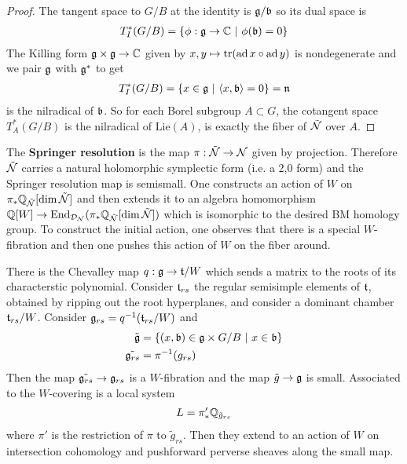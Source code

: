 \begin{proof}
    The tangent space to $G/B$ at the identity is $\mathfrak{g}/\mathfrak{b}$ so its dual space is \begin{align*}
        T^*_I(G/B) = \{\phi:\mathfrak{g} \to \mathbb{C} \ \vert \  \phi(\mathfrak{b}) = 0\}
    \end{align*} The Killing form $\mathfrak{g} \times \mathfrak{g} \to \mathbb{C}$ given by
    $x,y\mapsto \operatorname{tr}(\operatorname{ad} x \circ \operatorname{ad} y)$ is nondegenerate and we pair $\mathfrak{g}$ with $\mathfrak{g}^*$ 
    to get \begin{align*}
        T^*_I(G/B) = \{x\in \mathfrak{g} \ \vert \  \langle x,\mathfrak{b}\rangle = 0\} = \mathfrak{n}
    \end{align*} is the nilradical of $\mathfrak{b}$. So for each Borel subgroup $A\subset G$, 
    the cotangent space $T^*_{A}(G/B)$ is the nilradical of $\text{Lie}(A)$, is exactly 
    the fiber of $\tilde {{\mathcal{N}}}$ over $A$.
\end{proof}

The \textbf{Springer resolution} is the map $\pi:\tilde {{\mathcal{N}}} \to {\mathcal{N}}$
 given by projection.
Therefore $\tilde {{\mathcal{N}}}$ carries a natural holomorphic symplectic form (i.e. a 2,0 form)
and the Springer resolution map is semismall. One constructs an action of $W$ on 
$\pi_*\mathbb{Q}_{\tilde {{\mathcal{N}}}}[\dim \tilde {{\mathcal{N}}}]$ and then extends it to an algebra homomorphism 
$\mathbb{Q}[W] \to \operatorname{End}_{{\mathcal{D}}_{{\mathcal{N}}}}(\pi_*\mathbb{Q}_{\tilde {{\mathcal{N}}}}[\dim \tilde {{\mathcal{N}}}])$
which is isomorphic to the desired BM homology group. To construct the initial action,
one observes that there is a special $W$-fibration and then one pushes this action 
of $W$ on the fiber around. 

\hfill

There is the Chevalley map $q:\mathfrak{g}\to \mathfrak{t}/W$ which sends a 
matrix to the roots of its characterstic polynomial. Consider $\mathfrak{t}_{rs}$
the regular semisimple elements of $\mathfrak{t}$, obtained by ripping out the 
root hyperplanes, and consider a dominant chamber $\mathfrak{t}_{rs}/W$.
Consider $\mathfrak{g}_{rs} = q^{-1}(\mathfrak{t}_{rs}/W)$ and 
\begin{align*}
    \tilde{\mathfrak{g}}  &= \{(x,\mathfrak{b})\in \mathfrak{g}\times G/B \ \vert \  x\in \mathfrak{b}\} \\
    \tilde{\mathfrak{g}_{rs}} &= \pi^{-1}(g_{rs})
\end{align*} 
Then the map $\tilde{\mathfrak{g}_{rs}} \to \mathfrak{g}_{rs}$ is a $W$-fibration and 
the map $\tilde g \to \mathfrak{g}$ is small. Associated to the $W$-covering is 
a local system \begin{align*}
    L = \pi'_*\mathbb{Q}_{\tilde g_{rs}}
\end{align*} where $\pi'$ is the restriction of $\pi$ to $\tilde g_{rs}$.
Then they extend to an action of $W$ on intersection cohomology and pushforward perverse
sheaves along the small map.

